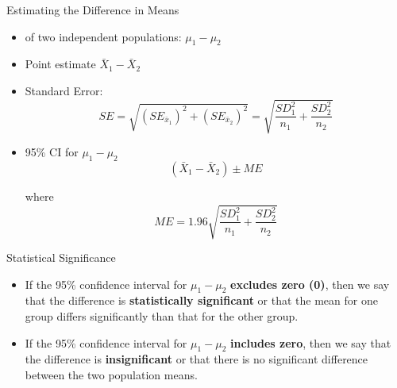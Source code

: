 \documentclass[14pt]{beamer}\usepackage[]{graphicx}\usepackage[]{color}
\begin{document}
\begin{frame}[fragile]{Estimating the Difference in Means}

\begin{itemize}
\item<1-> of two independent populations: $\mu_1 - \mu_2$
\item<2-> Point estimate $\bar{X}_1 - \bar{X}_2$
\item<3-> Standard Error:
{\small{
\begin{equation*}
SE = \sqrt{ (SE_{\bar{x}_1})^2 + (SE_{\bar{x}_2})^2 } = \sqrt{ \frac{SD_1^2}{n_1} + \frac{SD_2^2}{n_2}}
\end{equation*}
}}
\item<4-> 95\% CI for $\mu_1 - \mu_2$
\begin{equation*}
(\bar{X}_1 - \bar{X}_2) \pm ME
\end{equation*}

where 
{\small{
\begin{equation*}
 ME = 1.96 \sqrt{ \frac{SD_1^2}{n_1} + \frac{SD_2^2}{n_2}}
\end{equation*}
}}
\end{itemize}
\end{frame}

\begin{frame}[fragile]{Statistical Significance}

\begin{itemize}
\item<1-> If the 95\% confidence interval for $\mu_1 - \mu_2$ \textbf{excludes zero (0)}, then we  say that the difference is \textbf{statistically significant} or that the mean for one group differs significantly than that for the other group.
\item<2-> If the 95\% confidence interval for $\mu_1 - \mu_2$ \textbf{includes zero}, then we say that the difference is \textbf{insignificant} or that there is no significant  difference between the two population means.
\end{itemize}
\end{frame}
\end{document}
